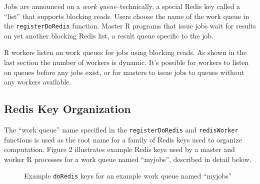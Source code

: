 \documentclass[12pt]{article}
\begin{document}
Jobs are announced on a \emph{work queue}--technically, a special Redis key
called a ``list'' that supports blocking reads. Users choose the name of the
work queue in the \verb+registerDoRedis+ function. Master R programs that issue
jobs wait for results on yet another blocking Redis list, a result queue
specific to the job.

R workers listen on work queues for jobs using blocking reads.  As shown in the
last section the number of workers is dynamic.  It's possible for workers to
listen on queues before any jobs exist, or for masters to issue jobs to queues
without any workers available.


\subsection{Redis Key Organization}

The ``work queue'' name specified in the {\tt registerDoRedis} and
{\tt redisWorker} functions is used as the root name for a family of Redis
keys used to organize computation. Figure 2 illustrates example Redis
keys used by a master and worker R processes for a work queue named ``myjobs'',
described in detail below.

\begin{figure}[!ht]
\begin{center}
\end{center}
\caption{Example {\tt doRedis} keys for an example work queue named ``myjobs''}
\label{keys}
\end{figure}
\end{document}
